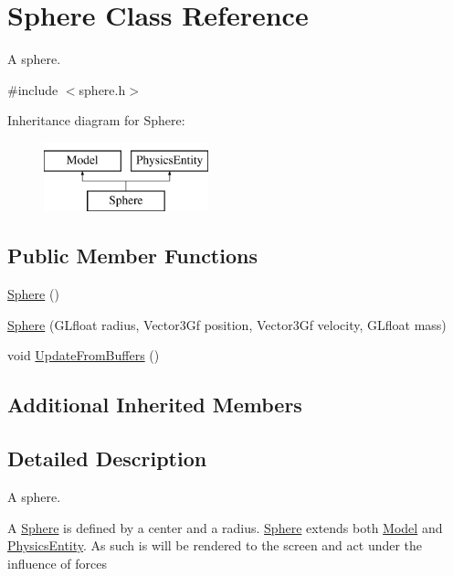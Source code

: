 \hypertarget{classSphere}{}\section{Sphere Class Reference}
\label{classSphere}


A sphere.  




{\ttfamily \#include $<$sphere.\+h$>$}

Inheritance diagram for Sphere\+:\begin{figure}[H]
\begin{center}
\leavevmode
\includegraphics[height=2.000000cm]{classSphere}
\end{center}
\end{figure}
\subsection*{Public Member Functions}
\begin{DoxyCompactItemize}
\item 
\hyperlink{classSphere_a890a63ff583cb88e7ec4e840b4ef5eb9}{Sphere} ()
\item 
\hyperlink{classSphere_a6d47af660fd83089c6b26519e3d1ba0b}{Sphere} (G\+Lfloat radius, Vector3\+Gf position, Vector3\+Gf velocity, G\+Lfloat mass)
\item 
void \hyperlink{classSphere_acc0ef3890c5c5aa2758c347219e55801}{Update\+From\+Buffers} ()
\end{DoxyCompactItemize}
\subsection*{Additional Inherited Members}


\subsection{Detailed Description}
A sphere. 

A \hyperlink{classSphere}{Sphere} is defined by a center and a radius. \hyperlink{classSphere}{Sphere} extends both \hyperlink{classModel}{Model} and \hyperlink{classPhysicsEntity}{Physics\+Entity}. As such is will be rendered to the screen and act under the influence of forces 

